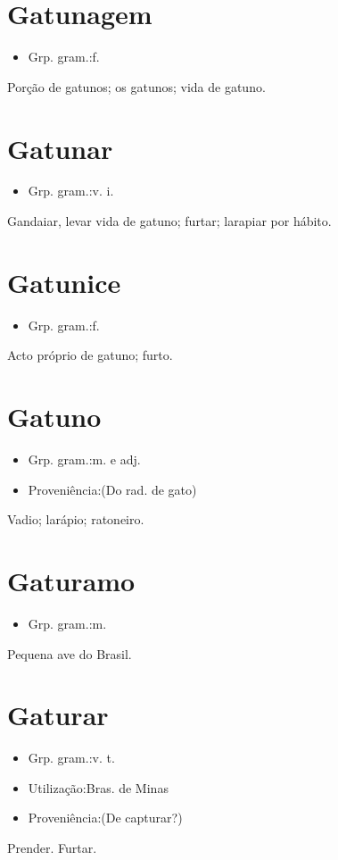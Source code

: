 \section{Gatunagem}
\begin{itemize}
\item {Grp. gram.:f.}
\end{itemize}
Porção de gatunos; os gatunos; vida de gatuno.
\section{Gatunar}
\begin{itemize}
\item {Grp. gram.:v. i.}
\end{itemize}
Gandaiar, levar vida de gatuno; furtar; larapiar por hábito.
\section{Gatunice}
\begin{itemize}
\item {Grp. gram.:f.}
\end{itemize}
Acto próprio de gatuno; furto.
\section{Gatuno}
\begin{itemize}
\item {Grp. gram.:m.  e  adj.}
\end{itemize}
\begin{itemize}
\item {Proveniência:(Do rad. de \textunderscore gato\textunderscore )}
\end{itemize}
Vadio; larápio; ratoneiro.
\section{Gaturamo}
\begin{itemize}
\item {Grp. gram.:m.}
\end{itemize}
Pequena ave do Brasil.
\section{Gaturar}
\begin{itemize}
\item {Grp. gram.:v. t.}
\end{itemize}
\begin{itemize}
\item {Utilização:Bras. de Minas}
\end{itemize}
\begin{itemize}
\item {Proveniência:(De \textunderscore capturar\textunderscore ?)}
\end{itemize}
Prender.
Furtar.
